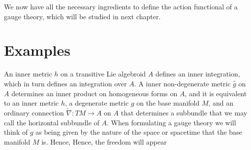 We now have all the necessary ingredients to define the action functional of a gauge theory, which will be studied in next chapter.

\section{Examples}

An inner metric $h$ on a transitive Lie algebroid $A$ defines an inner integration, which in turn defines an integration over $A$. A inner non-degenerate metric $\hat g$ on $A$ determines an inner product on homogeneous forms on $A$, and it is equivalent to an inner metric $h$, a degenerate metric $g$ on the base manifold $M$, and an ordinary connection $\tilde \nabla: TM \to A$ on $A$ that determines a subbundle that we may call the horizontal subbundle of $A$. When formulating a gauge theory we will think of $g$ as being given by the nature of the space or spacetime that the base manifold $M$ is. Hence, Hence, the freedom will appear